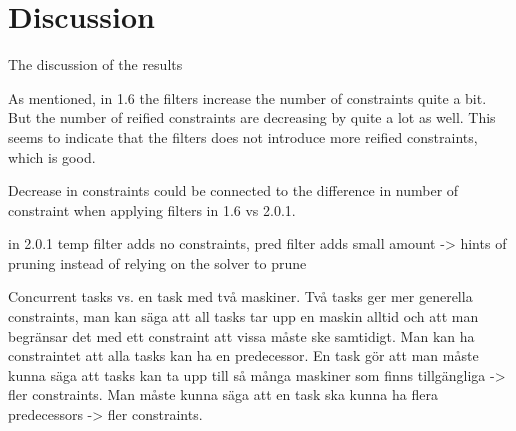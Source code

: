 \chapter{Discussion}\label{cha:discuss}
The discussion of the results

As mentioned, in 1.6 the filters increase the number of constraints quite a bit. But the number of reified constraints are decreasing by quite a lot as well. This seems to indicate that the filters does not introduce more reified constraints, which is good.

Decrease in constraints could be connected to the difference in number of constraint when applying filters in 1.6 vs 2.0.1.

in 2.0.1 temp filter adds no constraints, pred filter adds small amount -> hints of pruning instead of relying on the solver to prune

Concurrent tasks vs. en task med två maskiner.
Två tasks ger mer generella constraints, man kan säga att all tasks tar upp en maskin alltid och att man begränsar det med ett constraint att vissa måste ske samtidigt. Man kan ha constraintet att alla tasks kan ha en predecessor.
En task gör att man måste kunna säga att tasks kan ta upp till så många maskiner som finns tillgängliga -> fler constraints. Man måste kunna säga att en task ska kunna ha flera predecessors -> fler constraints.

